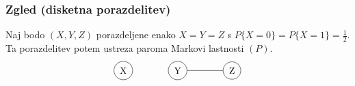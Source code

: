 \documentclass{beamer}
\begin{document}
\begin{frame}
    \frametitle{Zgled (disketna porazdelitev)}
    Naj bodo $(X,Y,Z)$ porazdeljene enako $X=Y=Z$ s $P\{X=0\} = P\{X=1\} = \frac{1}{2}. $
    Ta porazdelitev potem ustreza paroma Markovi lastnosti $(P)$.\\
    \begin{align*}
        
    \begin{tikzpicture}
        \node[shape=circle,draw=black] (X) at (3,0) {X};
        \node[shape=circle,draw=black] (Y) at (5,0) {Y};
        \node[shape=circle,draw=black] (Z) at (7,0) {Z};
        \path [-] (Y) edge node[left] {} (Z);
    \end{tikzpicture}
    \end{align*}
\end{frame}
\end{document}
